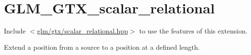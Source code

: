 \hypertarget{group__gtx__scalar__relational}{}\section{G\+L\+M\+\_\+\+G\+T\+X\+\_\+scalar\+\_\+relational}
\label{group__gtx__scalar__relational}
Include $<$\mbox{\hyperlink{scalar__relational_8hpp}{glm/gtx/scalar\+\_\+relational.\+hpp}}$>$ to use the features of this extension.

Extend a position from a source to a position at a defined length. 